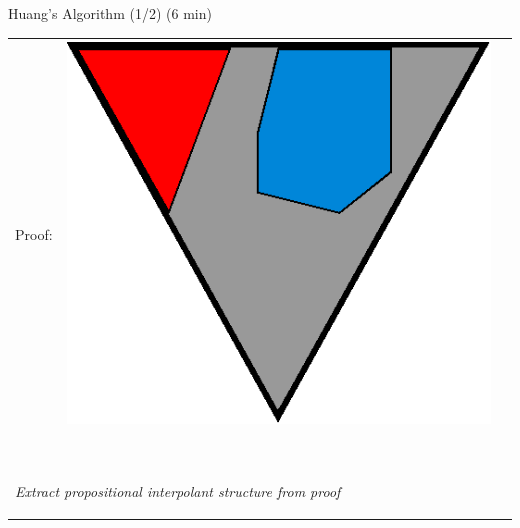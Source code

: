\documentclass[final,compress]{beamer}
\begin{document}
\subsection{}
\begin{frame}{Huang's Algorithm (1/2) (6 min)}
	\small
	
	\begin{tabular}{p{}ll}

		Proof: 
		&

		\multicolumn{1}{m{\fakemulticolwidth}}{
			\includegraphics[width=\proofwidth]{figures/two_phase_draft_proof}
		}
		&
		\vspace*{0.2em}
		\\

		\multicolumn{2}{l}{
			\proofindent{\stagearrow} ~\parbox[c]{14em}{\raggedright \emph{ Extract propositional interpolant structure from proof}}
			\vspace*{0.2em}
		}
		\\


\end{tabular}
\end{frame}
\end{document}
